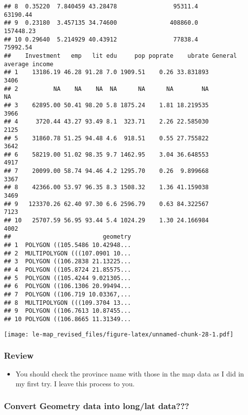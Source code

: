 \documentclass[
]{article}
\providecommand{\tightlist}{%
  \setlength{\itemsep}{0pt}\setlength{\parskip}{0pt}}
\begin{document}
\begin{verbatim}
## 8  0.35220  7.840459 43.28478                95311.4              63190.44
## 9  0.23180  3.457135 34.74600               408860.0             157448.23
## 10 0.29640  5.214929 40.43912                77838.4              75992.54
##    Investment   emp   lit edu     pop poprate    ubrate General average income
## 1    13186.19 46.28 91.28 7.0 1909.51    0.26 33.831893                   3406
## 2          NA    NA    NA  NA      NA      NA        NA                     NA
## 3    62895.00 50.41 98.20 5.8 1875.24    1.81 18.219535                   3966
## 4     3720.44 43.27 93.49 8.1  323.71    2.26 22.585030                   2125
## 5    31860.78 51.25 94.48 4.6  918.51    0.55 27.755822                   3642
## 6    58219.00 51.02 98.35 9.7 1462.95    3.04 36.648553                   4917
## 7    20099.00 58.74 94.46 4.2 1295.70    0.26  9.899668                   3367
## 8    42366.00 53.97 96.35 8.3 1508.32    1.36 41.159038                   3469
## 9   123370.26 62.40 97.30 6.6 2596.79    0.63 84.322567                   7123
## 10   25707.59 56.95 93.44 5.4 1024.29    1.30 24.166984                   4002
##                          geometry
## 1  POLYGON ((105.5486 10.42948...
## 2  MULTIPOLYGON (((107.0901 10...
## 3  POLYGON ((106.2838 21.13225...
## 4  POLYGON ((105.8724 21.85575...
## 5  POLYGON ((105.4244 9.021305...
## 6  POLYGON ((106.1306 20.99494...
## 7  POLYGON ((106.719 10.03367,...
## 8  MULTIPOLYGON (((109.3704 13...
## 9  POLYGON ((106.7613 10.87455...
## 10 POLYGON ((106.8665 11.31349...
\end{verbatim}

\texttt{[image: le-map\_revised\_files/figure-latex/unnamed-chunk-28-1.pdf]}

\hypertarget{review-1}{%
\subsubsection{Review}\label{review-1}}

\begin{itemize}
\tightlist
\item
  You should check the province name with those in the map data as I did
  in my first try. I leave this process to you.
\end{itemize}

\hypertarget{convert-geometry-data-into-longlat-data}{%
\subsubsection{Convert Geometry data into long/lat
data???}\label{convert-geometry-data-into-longlat-data}}
\end{document}
